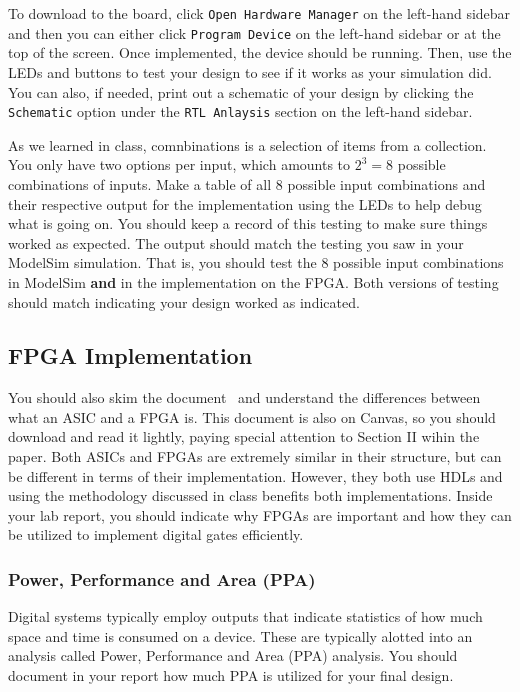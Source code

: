 \documentclass{article}
\begin{document}
To download to the board, click \verb!Open Hardware Manager! on the
left-hand sidebar and then you can either click \verb!Program Device!
on the left-hand sidebar or at the top of the screen.
Once implemented, the device should be running.
Then, use the LEDs and buttons to test
your design to see if it works as your simulation did.  You can also,
if needed, print out a schematic of your design by clicking the
\verb!Schematic! option under the \verb!RTL Anlaysis! section on the
left-hand sidebar.

As we learned in class, comnbinations is a selection of items from a
collection.  You only have two options per input, which amounts to
$2^3 = 8$ possible combinations of inputs.  Make a table of all $8$
possible input combinations and their respective output for the
implementation using the LEDs to help debug what is going on.  You
should keep a record of this testing to make sure things worked as
expected.  The output should match the testing you saw in your
ModelSim simulation.  That is, you should test the $8$ possible input
combinations in ModelSim \textbf{and} in the implementation on the
FPGA. Both versions of testing should match indicating your design
worked as indicated.

\subsection{FPGA Implementation}

You should also skim the document~\cite{7086413} and understand the
differences between what an ASIC and a FPGA is.  This document is also on
Canvas, so you should download and read it lightly, paying special
attention to Section II wihin the paper.
Both ASICs and FPGAs are extremely similar in
their structure, but can be different in terms of
their implementation.  However, they both use HDLs and using the
methodology discussed in class benefits both implementations.
Inside your lab report, you
should indicate why FPGAs are important and how they can be utilized
to implement digital gates efficiently.

\subsubsection{Power, Performance and Area (PPA)}

Digital systems typically employ outputs that indicate statistics of
how much space and time is consumed on a device.  These are typically
alotted into an analysis called Power, Performance and Area (PPA)
analysis.  You should document in your report how much PPA is utilized
for your final design.
\end{document}
